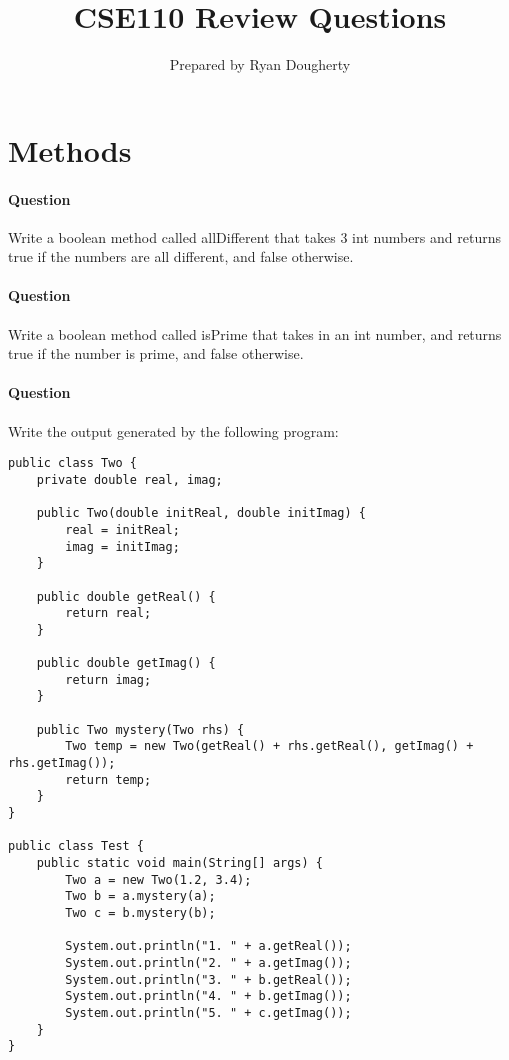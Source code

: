 \documentclass{article}
\title{CSE110 Review Questions}
\author{Prepared by Ryan Dougherty}
\date{}
\begin{document}
\maketitle

\section{Methods}


\setcounter{question_num}{1}
\paragraph{Question }
Write a boolean method called allDifferent that takes 3 int numbers and returns true if the numbers are all different, and false otherwise.

\addtocounter{question_num}{1}
\paragraph{Question }
Write a boolean method called isPrime that takes in an int number, and returns true if the number is prime, and false otherwise.

\addtocounter{question_num}{1}
\paragraph{Question }
Write the output generated by the following program:
\begin{lstlisting}
public class Two {
	private double real, imag;

	public Two(double initReal, double initImag) {
		real = initReal;
		imag = initImag;
	}

	public double getReal() {
		return real;
	}

	public double getImag() {
		return imag;
	}

	public Two mystery(Two rhs) {
		Two temp = new Two(getReal() + rhs.getReal(), getImag() + rhs.getImag());
		return temp;
	}
}

public class Test {
	public static void main(String[] args) {
		Two a = new Two(1.2, 3.4);
		Two b = a.mystery(a);
		Two c = b.mystery(b);

		System.out.println("1. " + a.getReal());
		System.out.println("2. " + a.getImag());
		System.out.println("3. " + b.getReal());
		System.out.println("4. " + b.getImag());
		System.out.println("5. " + c.getImag());
	}
}
\end{lstlisting}
\end{document}

